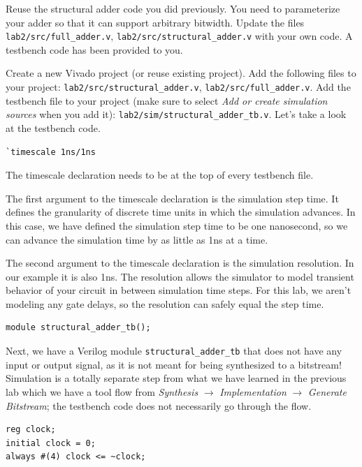 \documentclass[11pt]{article}
\begin{document}
Reuse the structural adder code you did previously. You need to parameterize your adder so that it can support arbitrary bitwidth. Update the files \verb|lab2/src/full_adder.v|, \verb|lab2/src/structural_adder.v| with your own code. A testbench code has been provided to you.

Create a new Vivado project (or reuse existing project). Add the following files to your project: \verb|lab2/src/structural_adder.v|, \verb|lab2/src/full_adder.v|. Add the testbench file to your project (make sure to select \emph{Add or create simulation sources} when you add it): \verb|lab2/sim/structural_adder_tb.v|. Let's take a look at the testbench code.

\begin{verbatim}
`timescale 1ns/1ns
\end{verbatim}

The timescale declaration needs to be at the top of every testbench file.

The first argument to the timescale declaration is the simulation step time.
It defines the granularity of discrete time units in which the simulation advances.
In this case, we have defined the simulation step time to be one nanosecond, so we can advance the simulation time by as little as 1ns at a time.

The second argument to the timescale declaration is the simulation resolution.
In our example it is also 1ns.
The resolution allows the simulator to model transient behavior of your circuit in between simulation time steps.
For this lab, we aren't modeling any gate delays, so the resolution can safely equal the step time.

\begin{verbatim}
module structural_adder_tb();
\end{verbatim}

Next, we have a Verilog module \verb|structural_adder_tb| that does not have any input or output signal, as it is not meant for being synthesized to a bitstream! Simulation is a totally separate step from what we have learned in the previous lab which we have a tool flow from \emph{Synthesis} $\rightarrow$ \emph{Implementation} $\rightarrow$ \emph{Generate Bitstream}; the testbench code does not necessarily go through the flow.

\begin{verbatim}
reg clock;
initial clock = 0;
always #(4) clock <= ~clock;
\end{verbatim}
\end{document}
